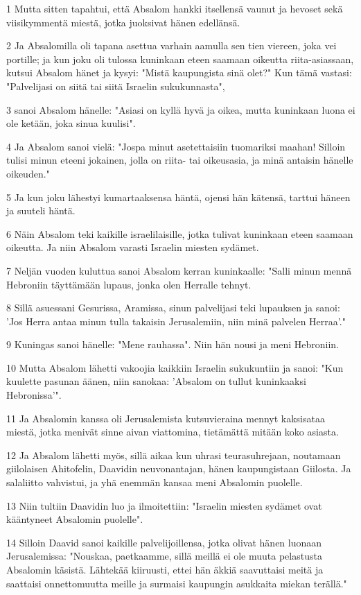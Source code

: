 \par 1 Mutta sitten tapahtui, että Absalom hankki itsellensä vaunut ja hevoset sekä viisikymmentä miestä, jotka juoksivat hänen edellänsä.
\par 2 Ja Absalomilla oli tapana asettua varhain aamulla sen tien viereen, joka vei portille; ja kun joku oli tulossa kuninkaan eteen saamaan oikeutta riita-asiassaan, kutsui Absalom hänet ja kysyi: "Mistä kaupungista sinä olet?" Kun tämä vastasi: "Palvelijasi on siitä tai siitä Israelin sukukunnasta",
\par 3 sanoi Absalom hänelle: "Asiasi on kyllä hyvä ja oikea, mutta kuninkaan luona ei ole ketään, joka sinua kuulisi".
\par 4 Ja Absalom sanoi vielä: "Jospa minut asetettaisiin tuomariksi maahan! Silloin tulisi minun eteeni jokainen, jolla on riita- tai oikeusasia, ja minä antaisin hänelle oikeuden."
\par 5 Ja kun joku lähestyi kumartaaksensa häntä, ojensi hän kätensä, tarttui häneen ja suuteli häntä.
\par 6 Näin Absalom teki kaikille israelilaisille, jotka tulivat kuninkaan eteen saamaan oikeutta. Ja niin Absalom varasti Israelin miesten sydämet.
\par 7 Neljän vuoden kuluttua sanoi Absalom kerran kuninkaalle: "Salli minun mennä Hebroniin täyttämään lupaus, jonka olen Herralle tehnyt.
\par 8 Sillä asuessani Gesurissa, Aramissa, sinun palvelijasi teki lupauksen ja sanoi: 'Jos Herra antaa minun tulla takaisin Jerusalemiin, niin minä palvelen Herraa'."
\par 9 Kuningas sanoi hänelle: "Mene rauhassa". Niin hän nousi ja meni Hebroniin.
\par 10 Mutta Absalom lähetti vakoojia kaikkiin Israelin sukukuntiin ja sanoi: "Kun kuulette pasunan äänen, niin sanokaa: 'Absalom on tullut kuninkaaksi Hebronissa'".
\par 11 Ja Absalomin kanssa oli Jerusalemista kutsuvieraina mennyt kaksisataa miestä, jotka menivät sinne aivan viattomina, tietämättä mitään koko asiasta.
\par 12 Ja Absalom lähetti myös, sillä aikaa kun uhrasi teurasuhrejaan, noutamaan giilolaisen Ahitofelin, Daavidin neuvonantajan, hänen kaupungistaan Giilosta. Ja salaliitto vahvistui, ja yhä enemmän kansaa meni Absalomin puolelle.
\par 13 Niin tultiin Daavidin luo ja ilmoitettiin: "Israelin miesten sydämet ovat kääntyneet Absalomin puolelle".
\par 14 Silloin Daavid sanoi kaikille palvelijoillensa, jotka olivat hänen luonaan Jerusalemissa: "Nouskaa, paetkaamme, sillä meillä ei ole muuta pelastusta Absalomin käsistä. Lähtekää kiiruusti, ettei hän äkkiä saavuttaisi meitä ja saattaisi onnettomuutta meille ja surmaisi kaupungin asukkaita miekan terällä."
